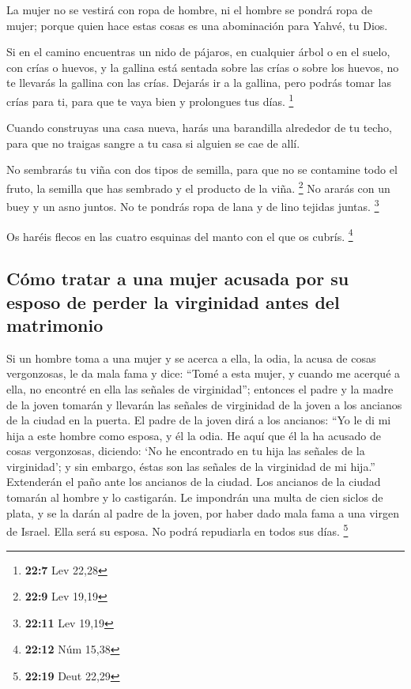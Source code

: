 \begin{paracol}{2}
 La mujer no se vestirá con ropa de hombre, ni el hombre
se pondrá ropa de mujer; porque quien hace estas cosas es una
abominación para Yahvé, tu Dios.

 Si en el camino encuentras un nido de pájaros, en
cualquier árbol o en el suelo, con crías o huevos, y la gallina está
sentada sobre las crías o sobre los huevos, no te llevarás la gallina
con las crías.  Dejarás ir a la gallina, pero podrás tomar
las crías para ti, para que te vaya bien y prolongues tus días.
\footnote{\textbf{22:7} Lev 22,28}

 Cuando construyas una casa nueva, harás una barandilla
alrededor de tu techo, para que no traigas sangre a tu casa si alguien
se cae de allí.

 No sembrarás tu viña con dos tipos de semilla, para que
no se contamine todo el fruto, la semilla que has sembrado y el producto
de la viña. \footnote{\textbf{22:9} Lev 19,19}  No ararás
con un buey y un asno juntos.  No te pondrás ropa de lana
y de lino tejidas juntas. \footnote{\textbf{22:11} Lev 19,19}

 Os haréis flecos en las cuatro esquinas del manto con el
que os cubrís. \footnote{\textbf{22:12} Núm 15,38}

\hypertarget{cuxf3mo-tratar-a-una-mujer-acusada-por-su-esposo-de-perder-la-virginidad-antes-del-matrimonio}{%
\subsection{Cómo tratar a una mujer acusada por su esposo de perder la
virginidad antes del
matrimonio}\label{cuxf3mo-tratar-a-una-mujer-acusada-por-su-esposo-de-perder-la-virginidad-antes-del-matrimonio}}

 Si un hombre toma a una mujer y se acerca a ella, la
odia,  la acusa de cosas vergonzosas, le da mala fama y
dice: ``Tomé a esta mujer, y cuando me acerqué a ella, no encontré en
ella las señales de virginidad'';  entonces el padre y la
madre de la joven tomarán y llevarán las señales de virginidad de la
joven a los ancianos de la ciudad en la puerta.  El padre
de la joven dirá a los ancianos: ``Yo le di mi hija a este hombre como
esposa, y él la odia.  He aquí que él la ha acusado de
cosas vergonzosas, diciendo: `No he encontrado en tu hija las señales de
la virginidad'; y sin embargo, éstas son las señales de la virginidad de
mi hija.'' Extenderán el paño ante los ancianos de la ciudad.
 Los ancianos de la ciudad tomarán al hombre y lo
castigarán.  Le impondrán una multa de cien siclos de
plata, y se la darán al padre de la joven, por haber dado mala fama a
una virgen de Israel. Ella será su esposa. No podrá repudiarla en todos
sus días. \footnote{\textbf{22:19} Deut 22,29}


\end{paracol}

